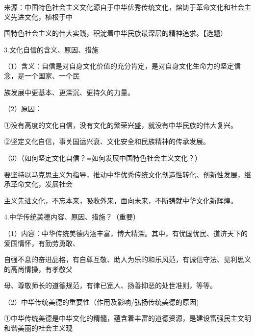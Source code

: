 \documentclass[lang=cn,11pt]{elegantbook}
\newcommand{\daofasym}[1]{{\daofasymbolfont #1}}
\newcommand{\daofasym}[1]{#1}
\begin{document}
来源：中国特色社会主义文化源自于中华优秀传统文化，熔铸于革命文化和社会主义先进文化，植根于中\par

国特色社会主义的伟大实践，积淀着中华民族最深层的精神追求。【选题）\par

3.文化自信的含义、原因、措施\par

（1）含义：自信是对自身文化价值的充分肯定，是对自身文化生命力的坚定信念，是一个国家、一个民\par

族发展中更基本、更深沉、更持久的力量。\par

（2）原因：\par

\daofasym{①}没有高度的文化自信，没有文化的繁荣兴盛，就没有中华民族的伟大复兴。\par

\daofasym{②}坚定文化自信，事关国运兴衰、文化安全和民族精神的传承发展。\par

（3）（如何坚定文化自信？=如何发展中国特色社会主义文化？）\par

要坚持以马克思主义为指导，推动中华优秀传统文化创造性转化、创新性发展，继承革命文化，发展社会\par

主义先进文化，不忘本来，吸收外来，面向未来，不断铸就中华文化新辉煌。\par

4.中华传统美德内容、原因、措施？（重要）\par

（1）内容：中华传统美德内涵丰富，博大精深。其中，有忧国忧民、道济天下的爱国情怀，有勤劳勇敢、\par

自强不息的奋进品格，有自尊互敬、助人为乐的和乐风范，有诚信守法、见利思义的高尚情操，有孝敬父\par

母、尊敬师长的道德规范，有律已宽人、扬善抑恶的处世准则，等等。\par

（2）中华传统美德的重要性（作用及影响/弘扬传统美德的原因)\par

\daofasym{①}中华传统美德是中华文化的精髓，蕴含着丰富的道德资源，是建设富强民主文明和谐美丽的社会主义现\par
\end{document}
